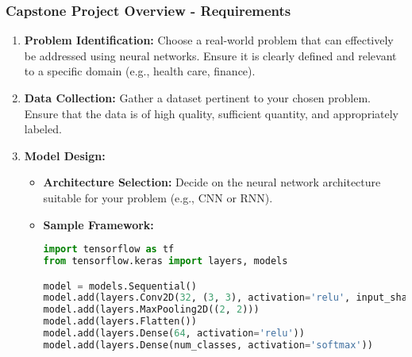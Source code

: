 \documentclass[aspectratio=169]{beamer}
\begin{document}
\begin{frame}[fragile]
    \frametitle{Capstone Project Overview - Requirements}
    \begin{enumerate}
        \item \textbf{Problem Identification:} 
            Choose a real-world problem that can effectively be addressed using neural networks. 
            Ensure it is clearly defined and relevant to a specific domain (e.g., health care, finance).
        
        \item \textbf{Data Collection:} 
            Gather a dataset pertinent to your chosen problem. 
            Ensure that the data is of high quality, sufficient quantity, and appropriately labeled.
        
        \item \textbf{Model Design:} 
            \begin{itemize}
                \item \textbf{Architecture Selection:} Decide on the neural network architecture suitable for your problem (e.g., CNN or RNN).
                \item \textbf{Sample Framework:}
                \begin{lstlisting}[language=Python]
import tensorflow as tf
from tensorflow.keras import layers, models

model = models.Sequential()
model.add(layers.Conv2D(32, (3, 3), activation='relu', input_shape=(height, width, channels)))
model.add(layers.MaxPooling2D((2, 2)))
model.add(layers.Flatten())
model.add(layers.Dense(64, activation='relu'))
model.add(layers.Dense(num_classes, activation='softmax'))
                \end{lstlisting}
            \end{itemize}
    \end{enumerate}
\end{frame}
\end{document}
